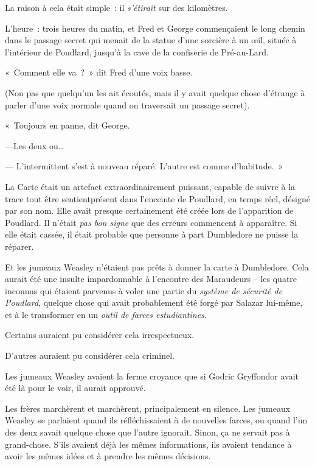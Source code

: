 La raison à cela était simple~: il \emph{s'étirait} sur des kilomètres.

L'heure~: trois heures du matin, et Fred et George commençaient le long chemin dans le passage secret qui menait de la statue d'une sorcière à un œil, située à l'intérieur de Poudlard, jusqu'à la cave de la confiserie de Pré-au-Lard.

«~Comment elle va~?~» dit Fred d'une voix basse.

(Non pas que quelqu'un les ait écoutés, mais il y avait quelque chose d'étrange à parler d'une voix normale quand on traversait un passage secret).

«~Toujours en panne, dit George.

---Les deux ou…

--- L'intermittent s'est à nouveau réparé. L'autre est comme d'habitude.~»

La Carte était un artefact extraordinairement puissant, capable de suivre à la trace tout être sentient\protect\footnotemark présent dans l'enceinte de Poudlard, en temps réel, désigné par son nom. Elle avait presque certainement été créée lors de l'apparition de Poudlard. Il n'était \emph{pas bon signe} que des erreurs commencent à apparaître. Si elle était cassée, il était probable que personne à part Dumbledore ne puisse la réparer.

Et les jumeaux Weasley n'étaient pas prêts à donner la carte à Dumbledore. Cela aurait été une insulte impardonnable à l'encontre des Maraudeurs -- les quatre inconnus qui étaient parvenus à voler une partie du \emph{système de sécurité de Poudlard}, quelque chose qui avait probablement été forgé par Salazar lui-même, et à le transformer en un \emph{outil de farces estudiantines}.

Certains auraient pu considérer cela irrespectueux.

D'autres auraient pu considérer cela criminel.

Les jumeaux Weasley avaient la ferme croyance que si Godric Gryffondor avait été là pour le voir, il aurait approuvé.

Les frères marchèrent et marchèrent, principalement en silence. Les jumeaux Weasley se parlaient quand ils réfléchissaient à de nouvelles farces, ou quand l'un des deux savait quelque chose que l'autre ignorait. Sinon, ça ne servait pas à grand-chose. S'ils avaient déjà les mêmes informations, ils avaient tendance à avoir les mêmes idées et à prendre les mêmes décisions.

